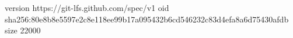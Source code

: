 version https://git-lfs.github.com/spec/v1
oid sha256:80e8b8e5597e2c8e118ee99b17a095432b6cd546232c83d4efa8a6d75430afdb
size 22000
